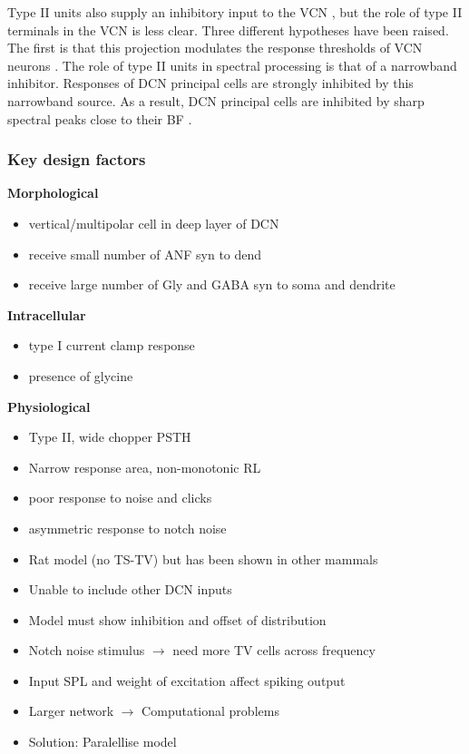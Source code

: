 Type II units also supply an inhibitory input to the VCN
\citep{WickesbergOertel:1990}, but the role of type II terminals in
the VCN is less clear. Three different hypotheses have been
raised. The ﬁrst is that this projection modulates the response
thresholds of VCN neurons \citep{PaoliniClark:1998}.  The role of type
II units in spectral processing is that of a narrowband
inhibitor. Responses of DCN principal cells are strongly inhibited by
this narrowband source. As a result, DCN principal cells are inhibited
by sharp spectral peaks close to their BF
\citep{SpirouDavisEtAl:1999}.



\subsubsection{Key design factors}


\textbf{Morphological}
\begin{itemize}
\item vertical/multipolar cell in deep layer of DCN \citep{Rhode:1999}
\item receive small number of ANF syn to dend
\item receive large number of Gly and GABA syn to soma and dendrite
\end{itemize}

\textbf{Intracellular}
\begin{itemize}
\item type I current clamp response
\item presence of glycine \citep{OertelWickesberg:1993}
\end{itemize}


\textbf{Physiological}
\begin{itemize}
\item Type II, wide chopper PSTH
  \citep{Rhode:1999,SpirouDavisEtAl:1999}
\item Narrow response area, non-monotonic RL
\item poor response to noise and clicks
\item asymmetric response to notch noise \citep{ReissYoung:2005}
\end{itemize}


\begin{itemize}
\item Rat model (no TS-TV) but has been shown in other mammals
\item Unable to include other DCN inputs
\item Model must show \DSTV inhibition and offset of distribution


\item Notch noise stimulus $\rightarrow$ need more TV cells across
  frequency
\item Input SPL and weight of excitation affect spiking output
\item Larger network $\rightarrow$ Computational problems
\item Solution: Paralellise model
\end{itemize}


